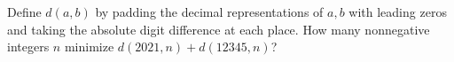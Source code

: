 Define $d(a,b)$ by padding the decimal representations of $a,b$ with leading zeros and taking the absolute digit difference at each place. How many nonnegative integers $n$ minimize $d(2021,n)+d(12345,n)$?
